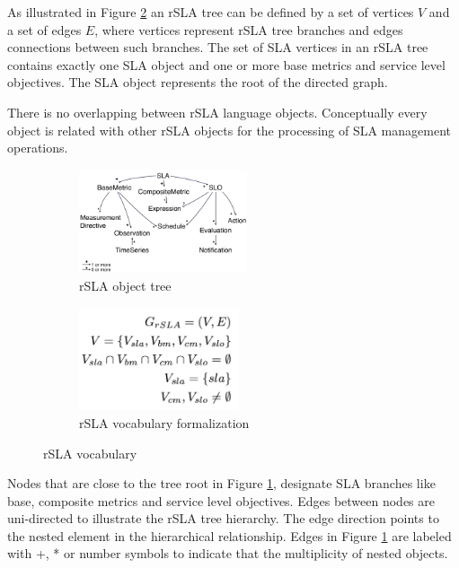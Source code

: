 As illustrated in Figure \ref{rslagraph} an rSLA tree can be defined by a set of vertices $V$ and a set of edges $E$, where vertices represent rSLA tree branches and edges connections between such branches. The set of SLA vertices in an rSLA tree contains exactly one SLA object and one or more base metrics and service level objectives. The SLA object represents the root of the directed graph. 

There is no overlapping between rSLA language objects. Conceptually every object is related with other rSLA objects for the processing of SLA management operations. 

\begin{figure}
        \centering
        \begin{subfigure}[b]{0.5\textwidth}
                \includegraphics[height=1.2in]{pics/rslaobject}
                \caption{rSLA object tree}
                \label{rslaobject}
        \end{subfigure}%
        \begin{subfigure}[b]{0.5\textwidth}
                \includegraphics[height=1.2in]{pics/rslagraph}
                \caption{rSLA vocabulary formalization}
                \label{rslagraph}
        \end{subfigure}
        \caption{rSLA vocabulary}\label{treegraph}
\end{figure}

Nodes that are close to the tree root in Figure \ref{rslaobject}, designate SLA branches like base, composite metrics and service level objectives. Edges between nodes are uni-directed to illustrate the rSLA tree hierarchy. The edge direction points to the nested element in the hierarchical relationship. 
Edges in Figure \ref{rslaobject} are labeled with +, * or number symbols to indicate that the multiplicity of nested objects. 

